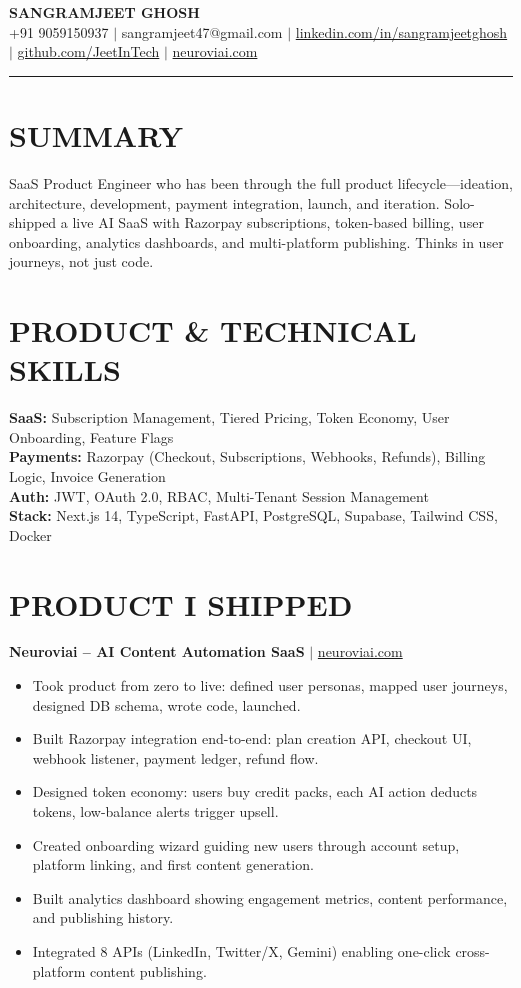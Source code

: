 \documentclass[10pt]{article}
\begin{document}
\begin{center}
{\Large \textbf{SANGRAMJEET GHOSH}} \\[2pt]
{\small +91 9059150937 $|$ sangramjeet47@gmail.com $|$
\href{https://www.linkedin.com/in/sangramjeetghosh}{linkedin.com/in/sangramjeetghosh} $|$
\href{https://github.com/JeetInTech}{github.com/JeetInTech} $|$
\href{https://neuroviai.com}{neuroviai.com}}
\end{center}

\noindent\rule{\textwidth}{0.4pt}

\section*{SUMMARY}
SaaS Product Engineer who has been through the full product lifecycle---ideation, architecture, development, payment integration, launch, and iteration. Solo-shipped a live AI SaaS with Razorpay subscriptions, token-based billing, user onboarding, analytics dashboards, and multi-platform publishing. Thinks in user journeys, not just code.

\section*{PRODUCT \& TECHNICAL SKILLS}
\textbf{SaaS:} Subscription Management, Tiered Pricing, Token Economy, User Onboarding, Feature Flags \\
\textbf{Payments:} Razorpay (Checkout, Subscriptions, Webhooks, Refunds), Billing Logic, Invoice Generation \\
\textbf{Auth:} JWT, OAuth 2.0, RBAC, Multi-Tenant Session Management \\
\textbf{Stack:} Next.js 14, TypeScript, FastAPI, PostgreSQL, Supabase, Tailwind CSS, Docker

\section*{PRODUCT I SHIPPED}
\textbf{Neuroviai -- AI Content Automation SaaS} $|$ \href{https://neuroviai.com}{neuroviai.com}
\begin{itemize}
\item Took product from zero to live: defined user personas, mapped user journeys, designed DB schema, wrote code, launched.
\item Built Razorpay integration end-to-end: plan creation API, checkout UI, webhook listener, payment ledger, refund flow.
\item Designed token economy: users buy credit packs, each AI action deducts tokens, low-balance alerts trigger upsell.
\item Created onboarding wizard guiding new users through account setup, platform linking, and first content generation.
\item Built analytics dashboard showing engagement metrics, content performance, and publishing history.
\item Integrated 8 APIs (LinkedIn, Twitter/X, Gemini) enabling one-click cross-platform content publishing.
\end{itemize}
\end{document}
